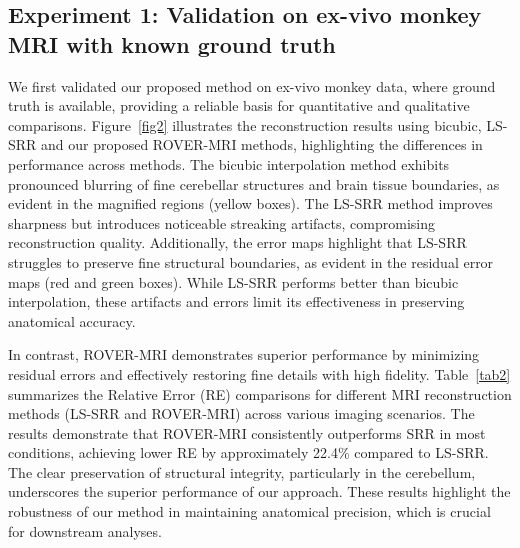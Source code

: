 \documentclass[AMA,STIX2COL]{MRM}
\begin{document}
\subsection{Experiment 1: Validation on ex-vivo monkey MRI with known ground truth}
%


%
We first validated our proposed method on ex-vivo monkey data, where ground truth is available, providing a reliable basis for quantitative and qualitative comparisons. Figure~\ref{fig2} illustrates the reconstruction results using bicubic, LS-SRR and our proposed ROVER-MRI methods, highlighting the differences in performance across methods. 
%
The bicubic interpolation method exhibits pronounced blurring of fine cerebellar structures and brain tissue boundaries, as evident in the magnified regions (yellow boxes). The LS-SRR method improves sharpness but introduces noticeable streaking artifacts, compromising reconstruction quality. Additionally, the error maps highlight that LS-SRR struggles to preserve fine structural boundaries, as evident in the residual error maps (red and green boxes). While LS-SRR performs better than bicubic interpolation, these artifacts and errors limit its effectiveness in preserving anatomical accuracy.

In contrast, ROVER-MRI demonstrates superior performance by minimizing residual errors and effectively restoring fine details with high fidelity. %
%
Table~\ref{tab2} summarizes the Relative Error (RE) comparisons for different MRI reconstruction methods (LS-SRR and ROVER-MRI) across various imaging scenarios. The results demonstrate that ROVER-MRI consistently outperforms SRR in most conditions, achieving lower RE by approximately 22.4\% compared to LS-SRR. 
%
The clear preservation of structural integrity, particularly in the cerebellum, underscores the superior performance of our approach. These results highlight the robustness of our method in maintaining anatomical precision, which is crucial for downstream analyses.
\end{document}
